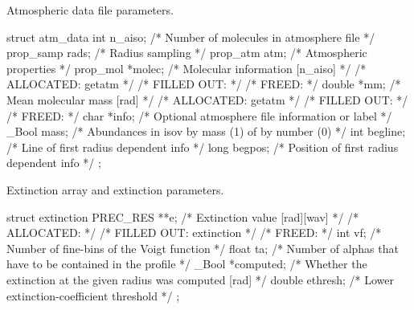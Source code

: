 \documentclass[letterpaper,12pt]{article}
\begin{document}
\noindent \newline
Atmospheric data file parameters.
\begin{plain}
struct atm_data{
  int n_aiso;            /* Number of molecules in atmosphere file          */
  prop_samp rads;        /* Radius sampling                                 */
  prop_atm atm;          /* Atmospheric properties                          */
  prop_mol *molec;       /* Molecular information [n_aiso]                  */
    /* ALLOCATED:	getatm						    */
    /* FILLED OUT:							    */
    /* FREED: 								    */ 
  double *mm;            /* Mean molecular mass [rad]                       */
    /* ALLOCATED:	getatm						    */
    /* FILLED OUT:							    */
    /* FREED: 								    */ 
  char *info;            /* Optional atmosphere file information or label   */
  _Bool mass;            /* Abundances in isov by mass (1) of by number (0) */
  int begline;           /* Line of first radius dependent info             */
  long begpos;           /* Position of first radius dependent info         */
};
\end{plain}

\noindent \newline
Extinction array and extinction parameters.
\begin{plain}
struct extinction{
  PREC_RES **e;      /* Extinction value [rad][wav]                         */
    /* ALLOCATED:							    */
    /* FILLED OUT: extinction						    */
    /* FREED: 								    */ 
  int vf;            /* Number of fine-bins of the Voigt function           */
  float ta;          /* Number of alphas that have to be contained in
                        the profile                                         */
  _Bool *computed;   /* Whether the extinction at the given radius was
                        computed [rad]                                      */
  double ethresh;    /* Lower extinction-coefficient threshold              */
};
\end{plain}
\end{document}
